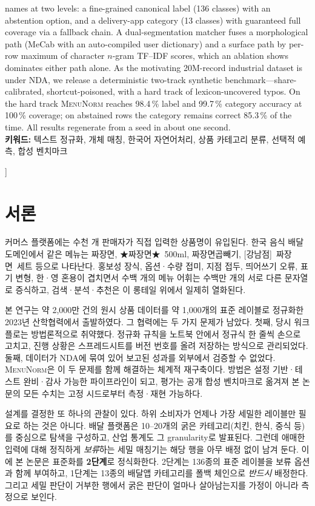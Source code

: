 \documentclass[10pt,twocolumn]{article}
\newcommand{\menunorm}{\textsc{MenuNorm}}
\begin{document}
{\begin{center}
\begin{minipage}{0.92\textwidth}
names at two levels: a fine-grained canonical label (136 classes) with an
abstention option, and a delivery-app category (13 classes) with guaranteed
full coverage via a fallback chain. A dual-segmentation matcher fuses a
morphological path (MeCab with an auto-compiled user dictionary) and a
surface path by per-row maximum of character $n$-gram TF--IDF scores, which
an ablation shows dominates either path alone. As the motivating 20M-record
industrial dataset is under NDA, we release a deterministic two-track
synthetic benchmark---share-calibrated, shortcut-poisoned, with a hard track
of lexicon-uncovered typos. On the hard track \menunorm{} reaches 98.4\,\%
label and 99.7\,\% category accuracy at 100\,\% coverage; on abstained rows
the category remains correct 85.3\,\% of the time. All results regenerate
from a seed in about one second.\\[4pt]
\textbf{키워드:} 텍스트 정규화, 개체 매칭, 한국어 자연어처리, 상품
카테고리 분류, 선택적 예측, 합성 벤치마크
\end{minipage}
\end{center}
\vspace{16pt}
}]

\section{서론}

커머스 플랫폼에는 수천 개 판매자가 직접 입력한 상품명이 유입된다. 한국
음식 배달 도메인에서 같은 메뉴는 \mbox{짜장면}, \mbox{★짜장면★ 500ml},
\mbox{짜장면곱빼기}, \mbox{[강남점] 짜장면 세트} 등으로 나타난다. 홍보성
장식, 옵션·수량 접미, 지점 접두, 띄어쓰기 오류, 표기 변형, 한·영 혼용이
겹치면서 수백 개의 메뉴 어휘는 수백만 개의 서로 다른 문자열로 증식하고,
검색·분석·추천은 이 롱테일 위에서 일제히 열화된다.

본 연구는 약 2,000만 건의 원시 상품 데이터를 약 1,000개의 표준 레이블로
정규화한 2023년 산학협력에서 출발하였다. 그 협력에는 두 가지 문제가
남았다. 첫째, 당시 워크플로는 방법론적으로 취약했다. 정규화 규칙을
노트북 안에서 정규식 한 줄씩 손으로 고치고, 진행 상황은 스프레드시트를
버전 번호를 올려 저장하는 방식으로 관리되었다. 둘째, 데이터가 NDA에 묶여
있어 보고된 성과를 외부에서 검증할 수 없었다. \menunorm{}은 이 두 문제를
함께 해결하는 체계적 재구축이다. 방법은 설정 기반·테스트 완비·감사
가능한 파이프라인이 되고, 평가는 공개 합성 벤치마크로 옮겨져 본 논문의
모든 수치는 고정 시드로부터 측정·재현 가능하다.

설계를 결정한 또 하나의 관찰이 있다. 하위 소비자가 언제나 가장 세밀한
레이블만 필요로 하는 것은 아니다. 배달 플랫폼은 10--20개의 굵은
카테고리(치킨, 한식, 중식 등)를 중심으로 탐색을 구성하고, 산업 통계도 그
granularity로 발표된다. 그런데 애매한 입력에 대해 정직하게
\emph{보류}하는 세밀 매칭기는 해당 행을 아무 배정 없이 남겨 둔다. 이에
본 논문은 표준화를 \textbf{2단계}로 정식화한다. 2단계는 136종의 표준
레이블을 보류 옵션과 함께 부여하고, 1단계는 13종의 배달앱 카테고리를
폴백 체인으로 \emph{반드시} 배정한다. 그리고 세밀 판단이 거부한 행에서
굵은 판단이 얼마나 살아남는지를 가정이 아니라 측정으로 보인다.
\end{document}
